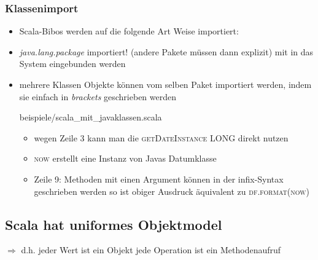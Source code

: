 \subsubsection{Klassenimport}
\begin{itemize}
  \item Scala-Bibos werden auf die folgende Art \und Weise
  importiert:
  
  
  
  \item \textit{java.lang.package} importiert! (andere Pakete müssen dann explizit)
  mit in das System eingebunden werden  
  \item mehrere Klassen \oder Objekte können vom selben Paket importiert werden, indem
  sie einfach in \textit{brackets} geschrieben werden
  
  
  {beispiele/scala_mit_javaklassen.scala}
  
  \begin{itemize}
    \item wegen Zeile 3 kann man die \textsc{getDateInstance} \und \textsc{LONG}
    direkt nutzen
    \item \textsc{now} erstellt eine Instanz von Javas Datumklasse
    \item Zeile 9: Methoden mit einen Argument können in der infix-Syntax
    geschrieben werden \und so ist obiger Ausdruck äquivalent zu
    \textsc{df.format(now)}
  \end{itemize}
\end{itemize}


\subsection{Scala hat uniformes Objektmodel}
$\Rightarrow$ d.h. jeder Wert ist ein Objekt \und jede Operation ist ein
Methodenaufruf



